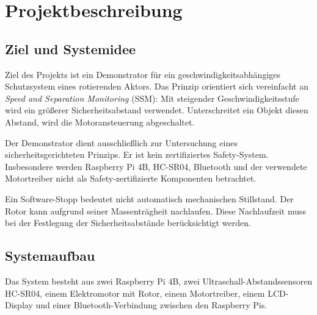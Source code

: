 \section{Projektbeschreibung}
\label{sec:project}

\subsection{Ziel und Systemidee}

Ziel des Projekts ist ein Demonstrator für ein geschwindigkeitsabhängiges
Schutzsystem eines rotierenden Aktors. Das Prinzip orientiert sich vereinfacht
an \emph{Speed and Separation Monitoring} (SSM): Mit steigender
Geschwindigkeitsstufe wird ein größerer Sicherheitsabstand verwendet.
Unterschreitet ein Objekt diesen Abstand, wird die Motoransteuerung abgeschaltet.

Der Demonstrator dient ausschließlich zur Untersuchung eines
sicherheitsgerichteten Prinzips. Er ist kein zertifiziertes Safety-System.
Insbesondere werden Raspberry Pi 4B, HC-SR04, Bluetooth und der verwendete
Motortreiber nicht als Safety-zertifizierte Komponenten betrachtet.


Ein Software-Stopp bedeutet nicht automatisch mechanischen Stillstand. Der Rotor
kann aufgrund seiner Massenträgheit nachlaufen. Diese Nachlaufzeit muss bei der
Festlegung der Sicherheitsabstände berücksichtigt werden.

\subsection{Systemaufbau}

Das System besteht aus zwei Raspberry Pi 4B, zwei Ultraschall-Abstandssensoren
HC-SR04, einem Elektromotor mit Rotor, einem Motortreiber, einem LCD-Display und
einer Bluetooth-Verbindung zwischen den Raspberry Pis.

